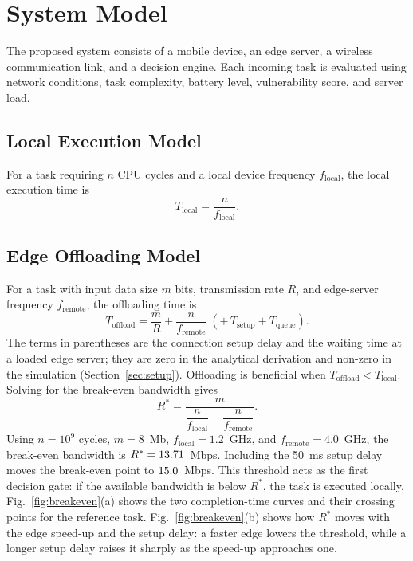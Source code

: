 \documentclass{ieeeaccess}
\begin{document}
\section{System Model}
\label{sec:model}
The proposed system consists of a mobile device, an edge server, a wireless communication link, and a decision engine. Each incoming task is evaluated using network conditions, task complexity, battery level, vulnerability score, and server load.

\subsection{Local Execution Model}
For a task requiring $n$ CPU cycles and a local device frequency $f_\text{local}$, the local execution time is
\begin{equation}
T_\text{local} = \frac{n}{f_\text{local}}.
\end{equation}

\subsection{Edge Offloading Model}
For a task with input data size $m$ bits, transmission rate $R$, and edge-server frequency $f_\text{remote}$, the offloading time is
\begin{equation}
T_\text{offload} = \frac{m}{R} + \frac{n}{f_\text{remote}} \;(+\, T_\text{setup} + T_\text{queue}).
\end{equation}
The terms in parentheses are the connection setup delay and the waiting time at a loaded edge server; they are zero in the analytical derivation and non-zero in the simulation (Section~\ref{sec:setup}). Offloading is beneficial when $T_\text{offload} < T_\text{local}$. Solving for the break-even bandwidth gives
\begin{equation}
R^{*} = \frac{m}{\dfrac{n}{f_\text{local}} - \dfrac{n}{f_\text{remote}}}.
\label{eq:threshold}
\end{equation}
Using $n = 10^{9}$ cycles, $m = 8$~Mb, $f_\text{local} = 1.2$~GHz, and $f_\text{remote} = 4.0$~GHz, the break-even bandwidth is $R^{*} = 13.71$~Mbps. Including the 50~ms setup delay moves the break-even point to $15.0$~Mbps. This threshold acts as the first decision gate: if the available bandwidth is below $R^{*}$, the task is executed locally. Fig.~\ref{fig:breakeven}(a) shows the two completion-time curves and their crossing points for the reference task. Fig.~\ref{fig:breakeven}(b) shows how $R^{*}$ moves with the edge speed-up and the setup delay: a faster edge lowers the threshold, while a longer setup delay raises it sharply as the speed-up approaches one.
\end{document}
